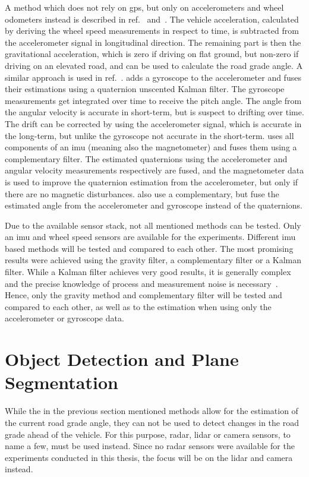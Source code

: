 A method which does not rely on \gls{gps}, but only on accelerometers and wheel odometers instead is described in ref.~\cite{Nilsson2012} and~\cite{Palella2016}.
The vehicle acceleration, calculated by deriving the wheel speed measurements in respect to time, is subtracted from the accelerometer signal in longitudinal direction.
The remaining part is then the gravitational acceleration, which is zero if driving on flat ground, but non-zero if driving on an elevated road, and can be used to calculate the road grade angle.
A similar approach is used in ref.~\cite{Sentouh2008}.
\cite{He2020} adds a gyroscope to the accelerometer and fuses their estimations using a quaternion unscented Kalman filter.
The gyroscope measurements get integrated over time to receive the pitch angle.
The angle from the angular velocity is accurate in short-term, but is suspect to drifting over time.
The drift can be corrected by using the accelerometer signal, which is accurate in the long-term, but unlike the gyroscope not accurate in the short-term.
\cite{Wu2016} uses all components of an \gls{imu} (meaning also the magnetometer) and fuses them using a complementary filter.
The estimated quaternions using the accelerometer and angular velocity measurements respectively are fused, and the magnetometer data is used to improve the quaternion estimation from the accelerometer, but only if there are no magnetic disturbances.
\cite{Euston2008} also use a complementary, but fuse the estimated angle from the accelerometer and gyroscope instead of the quaternions.

Due to the available sensor stack, not all mentioned methods can be tested.
Only an \gls{imu} and wheel speed sensors are available for the experiments.
Different \gls{imu} based methods will be tested and compared to each other.
The most promising results were achieved using the gravity filter, a complementary filter or a Kalman filter.
While a Kalman filter achieves very good results, it is generally complex and the precise knowledge of process and measurement noise is necessary~\cite{Higgins1975}.
Hence, only the gravity method and complementary filter will be tested and compared to each other, as well as to the estimation when using only the accelerometer or gyroscope data.



\section[Plane segmentation]{Object Detection and Plane Segmentation}
While the in the previous section mentioned methods allow for the estimation of the current road grade angle, they can not be used to detect changes in the road grade ahead of the vehicle.
For this purpose, \gls{radar}, \gls{lidar} or camera sensors, to name a few, must be used instead.
Since no \gls{radar} sensors were available for the experiments conducted in this thesis, the focus will be on the \gls{lidar} and camera instead.

